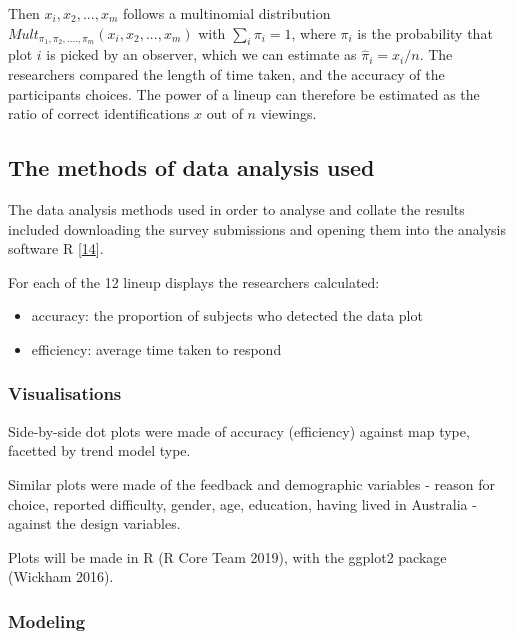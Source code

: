 \documentclass[conference,final,]{IEEEtran}
\providecommand{\tightlist}{%
  \setlength{\itemsep}{0pt}\setlength{\parskip}{0pt}}
\begin{document}
Then \(x_i, x_2, ..., x_m\) follows a multinomial
distribution\(Mult_{\pi_1, \pi_2, ...., \pi_m}(x_i, x_2, ..., x_m)\) with
\(\sum_i \pi_i = 1\), where \(\pi_i\) is the probability that plot \(i\) is picked by an
observer, which we can estimate as \(\hat{\pi}_i = x_i/n\).
The researchers compared the length of time taken, and the accuracy of the participants choices.
The power of a lineup can therefore be estimated as the ratio of correct
identifications \(x\) out of \(n\) viewings.

\hypertarget{the-methods-of-data-analysis-used}{%
\subsection{The methods of data analysis used}\label{the-methods-of-data-analysis-used}}

The data analysis methods used in order to analyse and collate the results included downloading the survey submissions and opening them into the analysis software R {[}\protect\hyperlink{ref-RCore}{14}{]}.

For each of the 12 lineup displays the researchers calculated:

\begin{itemize}
\tightlist
\item
  accuracy: the proportion of subjects who detected the data plot
\item
  efficiency: average time taken to respond
\end{itemize}

\hypertarget{visualisations}{%
\subsubsection{Visualisations}\label{visualisations}}

Side-by-side dot plots were made of accuracy (efficiency) against map type, facetted by trend model type.

Similar plots were made of the feedback and demographic variables - reason for choice, reported difficulty, gender, age, education, having lived in Australia - against the design variables.

Plots will be made in R (R Core Team 2019), with the ggplot2 package (Wickham 2016).

\hypertarget{modeling}{%
\subsubsection{Modeling}\label{modeling}}
\end{document}
